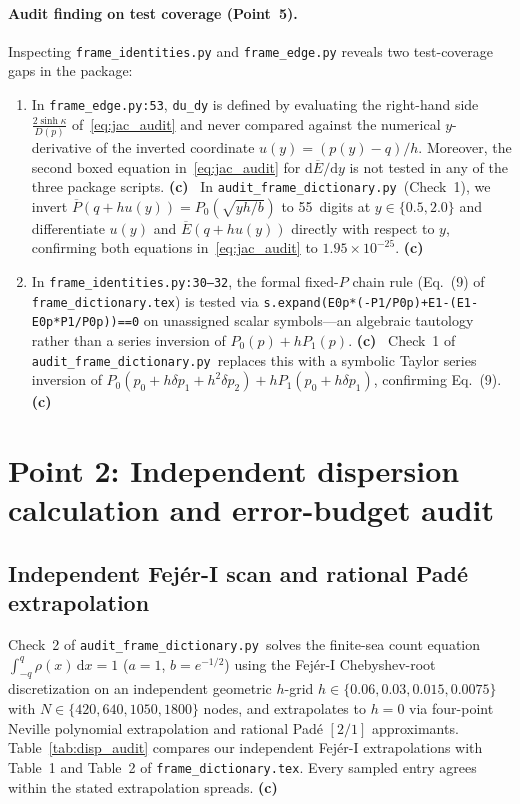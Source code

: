 \documentclass[11pt,a4paper]{article}
\newcommand{\Lc}{\textsf{\textbf{(c)}}\ }
\newcommand{\scr}{\texttt{audit\_\allowbreak frame\_\allowbreak dictionary.py}}
\newcommand{\dd}{\mathrm d}
\begin{document}
\paragraph{Audit finding on test coverage (Point~5).}
Inspecting \texttt{frame\_\allowbreak identities.py} and \texttt{frame\_\allowbreak edge.py}
reveals two test-coverage gaps in the package:
\begin{enumerate}
\item In \texttt{frame\_\allowbreak edge.py:53}, \texttt{du\_dy} is defined by
evaluating the right-hand side $\frac{2\sinh\kappa}{D(p)}$ of~\eqref{eq:jac_audit}
and never compared against the numerical $y$-derivative of the inverted coordinate
$u(y)=(p(y)-q)/h$. Moreover, the second boxed equation in~\eqref{eq:jac_audit} for
$\dd\overline E/\dd y$ is not tested in any of the three package scripts. \Lc
In \scr\ (Check~1), we invert $\overline P(q+hu(y))=P_0(\sqrt{yh/b})$ to 55~digits
at $y\in\{0.5,2.0\}$ and differentiate $u(y)$ and $\overline E(q+hu(y))$ directly
with respect to $y$, confirming both equations in~\eqref{eq:jac_audit} to
$1.95\times 10^{-25}$. \Lc
\item In \texttt{frame\_\allowbreak identities.py:30--32}, the formal fixed-$P$
chain rule (Eq.~(9) of \texttt{frame\_\allowbreak dictionary.tex}) is tested via
\texttt{s.expand(E0p*(-P1/P0p)+E1-(E1-E0p*P1/P0p))==0} on unassigned scalar symbols---an
algebraic tautology rather than a series inversion of $P_0(p)+hP_1(p)$. \Lc
Check~1 of \scr\ replaces this with a symbolic Taylor series inversion of
$P_0(p_0+h\delta p_1+h^2\delta p_2)+hP_1(p_0+h\delta p_1)$, confirming Eq.~(9). \Lc
\end{enumerate}

\section{Point 2: Independent dispersion calculation and error-budget audit}

\subsection{Independent Fej\'er-I scan and rational Pad\'e extrapolation}
Check~2 of \scr\ solves the finite-sea count equation $\int_{-q}^q\rho(x)\,\dd x=1$
($a=1$, $b=e^{-1/2}$) using the Fej\'er-I Chebyshev-root discretization on an
independent geometric $h$-grid $h\in\{0.06,0.03,0.015,0.0075\}$ with
$N\in\{420,640,1050,1800\}$ nodes, and extrapolates to $h=0$ via four-point
Neville polynomial extrapolation and rational Pad\'e $[2/1]$ approximants.
Table~\ref{tab:disp_audit} compares our independent Fej\'er-I extrapolations with
Table~1 and Table~2 of \texttt{frame\_\allowbreak dictionary.tex}. Every sampled
entry agrees within the stated extrapolation spreads. \Lc
\end{document}
